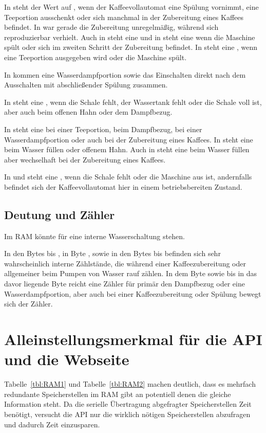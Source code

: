 In  steht der Wert auf , wenn der Kaffeevollautomat eine Spülung vornimmt, eine Teeportion ausschenkt oder sich manchmal in der Zubereitung eines Kaffees befindet.
In  war gerade die Zubereitung unregelmäßig, während sich  reproduzierbar verhielt.
Auch in  steht eine  und in  steht eine  wenn die Maschine spült oder sich im zweiten Schritt der Zubereitung befindet.
In  steht eine , wenn eine Teeportion ausgegeben wird oder die Maschine spült.

In  kommen eine Wasserdampfportion sowie das Einschalten direkt nach dem Ausschalten mit abschließender Spülung zusammen.

In  steht eine , wenn die Schale fehlt, der Wassertank fehlt oder die Schale voll ist, aber auch beim offenen Hahn oder dem Dampfbezug.

In  steht eine  bei einer Teeportion, beim Dampfbezug, bei einer Wasserdampfportion oder auch bei der Zubereitung eines Kaffees.
In  steht eine  beim Wasser füllen oder offenem Hahn.
Auch in  steht eine  beim Wasser füllen aber wechselhaft bei der Zubereitung eines Kaffees.

In  und  steht eine , wenn die Schale fehlt oder die Maschine aus ist, andernfalls befindet sich der Kaffeevollautomat hier in einem betriebsbereiten Zustand.

\subsection{Deutung und Zähler}
Im \ac{RAM} könnte  für eine interne Wasserschaltung stehen.

In den Bytes  bis , in Byte , sowie in den Bytes  bis  befinden sich sehr wahrscheinlich interne Zählstände, die während einer Kaffeezubereitung oder allgemeiner beim Pumpen von Wasser rauf zählen.
In dem Byte  sowie bis in das davor liegende Byte  reicht eine Zähler für primär den Dampfbezug oder eine Wasserdampfportion, aber auch bei einer Kaffeezubereitung oder Spülung bewegt sich der Zähler.

\section{Alleinstellungsmerkmal für die API und die Webseite}
Tabelle~\ref{tbl:RAM1} und Tabelle~\ref{tbl:RAM2} machen deutlich, dass es mehrfach redundante Speicherstellen im \ac{RAM} gibt an potentiell denen die gleiche Information steht.
Da die serielle Übertragung abgefragter Speicherstellen Zeit benötigt, versucht die \ac{API} nur die wirklich nötigen Speicherstellen abzufragen und dadurch Zeit einzusparen.

